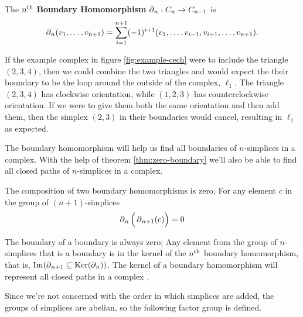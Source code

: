 \begin{definition}\label{def:boundary-homomorphism}
    The \(n\textsuperscript{th}\) \textbf{Boundary Homomorphism} \(\operatorname{\partial}_n : C_n \to C_{n-1}\) is
    \[
        \operatorname{\partial}_n (v_1,\dots , v_{n+1}) = \sum_{i=1}^{n+1} (-1)^{i+1}
        (v_1,\dots, v_{i-1}, v_{i+1}, \dots, v_{n+1})
        .
    \]
    \cite{hatcher}
\end{definition}


\begin{example}
    If the example complex in figure \ref{fig:example-cech} were to include the triangle \((2,3,4)\), then we could combine the two triangles and would expect the their boundary to be the loop around the outside of the complex, \(\ell_1\). The triangle \((2,3,4)\) has clockwise orientation, while \((1,2,3)\) has counterclockwise orientation. If we were to give them both the same orientation and then add them, then the simplex \((2,3)\) in their boundaries would cancel, resulting in \(\ell_1\) as expected.
\end{example}

The boundary homomorphism will help us find all boundaries of \(n\)-simplices in a complex. With the help of theorem \ref{thm:zero-boundary} we'll also be able to find all closed paths of \(n\)-simplices in a complex.

\begin{theorem}\label{thm:zero-boundary}
    The composition of two boundary homomorphisms is zero. For any element \(c\) in the group of \((n+1)\)-simplices
    \begin{align*}
		\operatorname{\partial}_{n} \Big( \operatorname{\partial}_{n+1} (c) \Big) = 0
	\end{align*}
\end{theorem}

The boundary of a boundary is always zero; Any element from the group of \(n\)-simplices that is a boundary is in the kernel of the \(n\textsuperscript{th}\) boundary homomorphism, that is, \(\operatorname{Im}(\operatorname{\partial}_{n+1} \subseteq \operatorname{Ker}(\operatorname{\partial}_n))\). The kernel of a boundary homomorphism will represent all closed paths in a complex .

Since we're not concerned with the order in which simplices are added, the groups of simplices are abelian, so the following factor group is defined.

